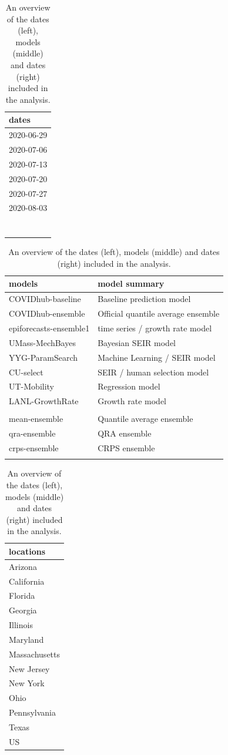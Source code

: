 \documentclass[
]{book}
\begin{document}
\begin{table}
\caption{\label{tab:overview}An overview of the dates (left), models (middle) and dates (right) included in the analysis.}

\begin{tabular}{l}
\toprule
dates\\
\midrule
2020-06-29\\
2020-07-06\\
2020-07-13\\
2020-07-20\\
2020-07-27\\
2020-08-03\\
\\
\\
\\
\\
\\
\\
\\

\end{tabular}
\begin{tabular}{ll}
\toprule
models & model summary\\
\midrule
COVIDhub-baseline & Baseline prediction model\\
COVIDhub-ensemble & Official quantile average ensemble\\
epiforecasts-ensemble1 & time series / growth rate model\\
UMass-MechBayes & Bayesian SEIR model\\
YYG-ParamSearch & Machine Learning / SEIR model\\
CU-select & SEIR / human selection model\\
UT-Mobility & Regression model\\
LANL-GrowthRate & Growth rate model\\
 & \\
mean-ensemble & Quantile average ensemble\\
qra-ensemble & QRA ensemble\\
crps-ensemble & CRPS ensemble\\
 & \\

\end{tabular}
\begin{tabular}{l}
\toprule
locations\\
\midrule
Arizona\\
California\\
Florida\\
Georgia\\
Illinois\\
Maryland\\
Massachusetts\\
New Jersey\\
New York\\
Ohio\\
Pennsylvania\\
Texas\\
US\\

\end{tabular}
\end{table}
\end{document}
